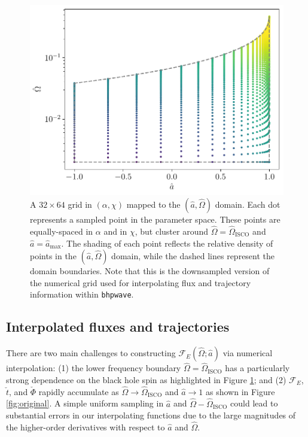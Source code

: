 \documentclass[%
 reprint,
 nofootinbib,
 amsmath,amssymb,
 aps,
 prd,
]{revtex4-2}
\begin{document}
\begin{figure}
    \centering
    \includegraphics[width=0.95\columnwidth]{figures/domain_sampling.pdf}
    \caption{A $32\times 64$ grid in $(\alpha, \chi)$ mapped to the $(\hat{a}, \hat{\Omega})$ domain.  Each dot represents a sampled point in the parameter space. These points are equally-spaced in $\alpha$ and in $\chi$, but cluster around $\hat{\Omega} = \hat{\Omega}_\mathrm{ISCO}$ and $\hat{a} = \hat{a}_\mathrm{max}$. The shading of each point reflects the relative density of points in the $(\hat{a}, \hat{\Omega})$ domain, while the dashed lines represent the domain boundaries. Note that this is the downsampled version of the numerical grid used for interpolating flux and trajectory information within \texttt{bhpwave}.}
    \label{fig:domain}
\end{figure}

\subsection{Interpolated fluxes and trajectories}
\label{sec:traj}

There are two main challenges to constructing $\mathcal{F}_E(\hat{\Omega}; \hat{a})$ via numerical interpolation: (1) the lower frequency boundary $\hat{\Omega}=\hat{\Omega}_\mathrm{ISCO}$ has a particularly strong dependence on the black hole spin as highlighted in Figure \ref{fig:domain}; and (2) $\mathcal{F}_E$, $\check{t}$, and $\check{\Phi}$ rapidly accumulate as $\hat{\Omega} \rightarrow \hat{\Omega}_\mathrm{ISCO}$ and $\hat{a} \rightarrow 1$ as shown in Figure \ref{fig:original}. A simple uniform sampling in $\hat{a}$ and $\hat{\Omega}-\hat{\Omega}_\mathrm{ISCO}$ could lead to substantial errors in our interpolating functions due to the large magnitudes of the higher-order derivatives with respect to $\hat{a}$ and $\hat{\Omega}$.
\end{document}
